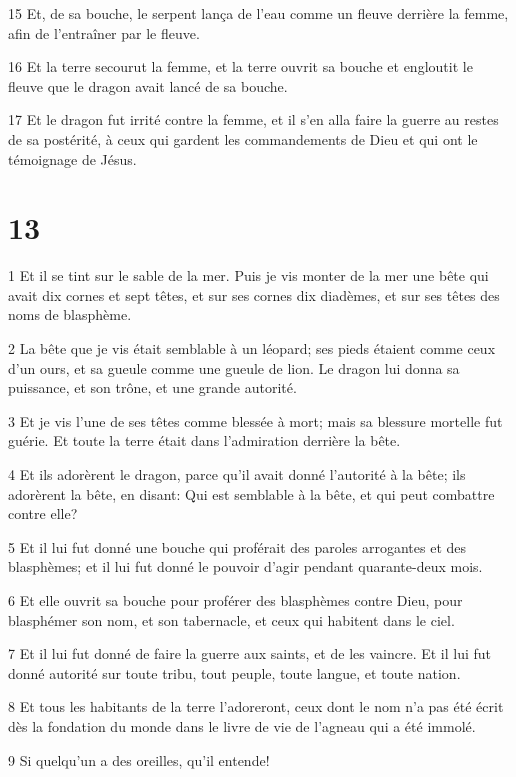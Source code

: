 \par 15 Et, de sa bouche, le serpent lança de l'eau comme un fleuve derrière la femme, afin de l'entraîner par le fleuve.
\par 16 Et la terre secourut la femme, et la terre ouvrit sa bouche et engloutit le fleuve que le dragon avait lancé de sa bouche.
\par 17 Et le dragon fut irrité contre la femme, et il s'en alla faire la guerre au restes de sa postérité, à ceux qui gardent les commandements de Dieu et qui ont le témoignage de Jésus.

\chapter{13}

\par 1 Et il se tint sur le sable de la mer. Puis je vis monter de la mer une bête qui avait dix cornes et sept têtes, et sur ses cornes dix diadèmes, et sur ses têtes des noms de blasphème.
\par 2 La bête que je vis était semblable à un léopard; ses pieds étaient comme ceux d'un ours, et sa gueule comme une gueule de lion. Le dragon lui donna sa puissance, et son trône, et une grande autorité.
\par 3 Et je vis l'une de ses têtes comme blessée à mort; mais sa blessure mortelle fut guérie. Et toute la terre était dans l'admiration derrière la bête.
\par 4 Et ils adorèrent le dragon, parce qu'il avait donné l'autorité à la bête; ils adorèrent la bête, en disant: Qui est semblable à la bête, et qui peut combattre contre elle?
\par 5 Et il lui fut donné une bouche qui proférait des paroles arrogantes et des blasphèmes; et il lui fut donné le pouvoir d'agir pendant quarante-deux mois.
\par 6 Et elle ouvrit sa bouche pour proférer des blasphèmes contre Dieu, pour blasphémer son nom, et son tabernacle, et ceux qui habitent dans le ciel.
\par 7 Et il lui fut donné de faire la guerre aux saints, et de les vaincre. Et il lui fut donné autorité sur toute tribu, tout peuple, toute langue, et toute nation.
\par 8 Et tous les habitants de la terre l'adoreront, ceux dont le nom n'a pas été écrit dès la fondation du monde dans le livre de vie de l'agneau qui a été immolé.
\par 9 Si quelqu'un a des oreilles, qu'il entende!
